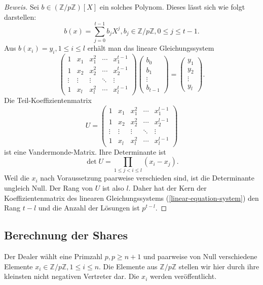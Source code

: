 \documentclass[12pt, a4paper, oneside, titlepage]{report}
\newcommand{\Z}{\mathds{Z}}
\newenvironment{bew}{\begin{proof}[Beweis]}{\end{proof}}
\theoremstyle{definition}
\begin{document}
\begin{bew}
		Sei $ b \in (\Z / p\Z)[X] $ ein solches Polynom. Dieses lässt sich wie folgt darstellen:
		$$ b(x) = \sum_{j=0}^{t-1} b_j X^j, b_j \in \Z / p\Z, 0 \leq j \leq t-1. $$
		Aus $ b(x_i) = y_i, 1 \leq i \leq l $ erhält man das lineare Gleichungssystem
		\begin{equation}\label{linear-equation-system}
			\begin{pmatrix}
			1 & x_1 & x_1^2 & \cdots & x_1^{t-1} \\
			1 & x_2 & x_2^2 & \cdots & x_2^{t-1} \\
			\vdots & \vdots & \vdots & \ddots & \vdots \\     
			1 & x_l & x_l^2 & \cdots & x_l^{t-1}
			\end{pmatrix}
			\begin{pmatrix}
			b_0 \\
			b_1 \\
			\vdots \\     
			b_{t-1}
			\end{pmatrix}
			=
			\begin{pmatrix}
			y_1 \\
			y_2 \\
			\vdots \\     
			y_l
			\end{pmatrix}.
		\end{equation}		
		Die Teil-Koeffizientenmatrix
		$$ U =
		\begin{pmatrix}
		1 & x_1 & x_1^2 & \cdots & x_1^{l-1} \\
		1 & x_2 & x_2^2 & \cdots & x_2^{l-1} \\
		\vdots & \vdots & \vdots & \ddots & \vdots \\     
		1 & x_l & x_l^2 & \cdots & x_l^{l-1}
		\end{pmatrix} $$
		ist eine Vandermonde-Matrix. Ihre Determinante ist
		$$ \det U = \prod_{1 \leq j < i \leq l} (x_i-x_j). $$
		Weil die $ x_i $ nach Voraussetzung paarweise verschieden sind, ist die Determinante ungleich Null. Der Rang von $ U $ ist also $ l $. Daher hat der Kern der Koeffizientenmatrix des linearen Gleichungssystems (\ref{linear-equation-system}) den Rang $ t-l $ und die Anzahl der Lösungen ist $ p^{t-l} $.
	\end{bew}
	
	\subsection{Berechnung der Shares}
	
	Der Dealer wählt eine Primzahl $ p, p \geq n + 1 $ und paarweise von Null verschiedene Elemente $ x_i \in \Z / p \Z, 1 \leq i \leq n $. Die Elemente aus $ \Z / p \Z $ stellen wir hier durch ihre kleinsten nicht negativen Vertreter dar. Die $ x_i $ werden veröffentlicht.
	
\end{document}
